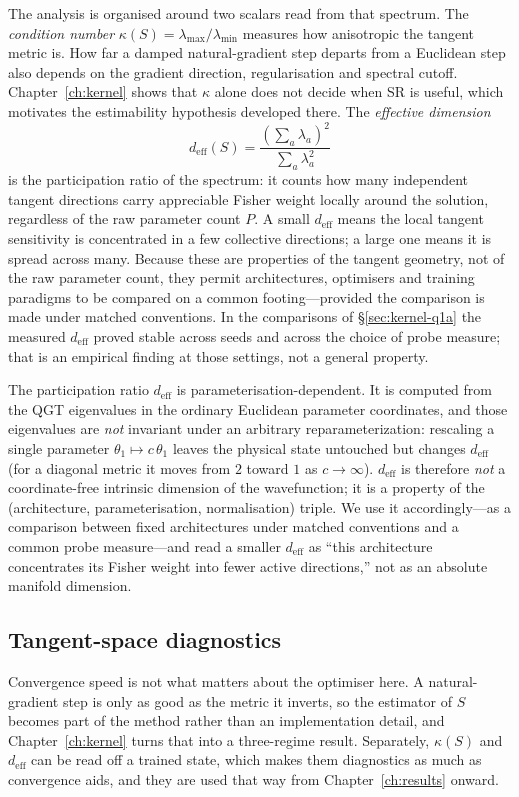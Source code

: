 The analysis is organised around two scalars read from that spectrum. The
\emph{condition number}
$\kappa(S)=\lambda_{\max}/\lambda_{\min}$ measures how anisotropic the tangent metric
is. How far a damped natural-gradient step departs from a Euclidean step also depends on the
gradient direction, regularisation and spectral cutoff. Chapter~\ref{ch:kernel} shows that
$\kappa$ alone does not decide when SR is useful, which motivates the estimability hypothesis
developed there. The \emph{effective dimension}
\begin{equation}
  d_{\mathrm{eff}}(S) = \frac{\left(\sum_a \lambda_a\right)^2}{\sum_a \lambda_a^2}
\end{equation}
is the participation ratio of the spectrum: it counts how many independent tangent
directions carry appreciable Fisher weight locally around the solution, regardless of the raw
parameter count $P$. A small $d_{\mathrm{eff}}$ means the local tangent sensitivity is
concentrated in a few collective directions; a large one means it is spread across many.
Because these are properties of the tangent geometry, not of the raw parameter count, they permit architectures, optimisers and training paradigms to be compared on a
common footing---provided the comparison is made under matched conventions. In the
comparisons of \S\ref{sec:kernel-q1a} the measured $d_{\mathrm{eff}}$ proved stable across
seeds and across the choice of probe measure; that is an empirical finding at those settings,
not a general property.

The participation ratio $d_{\mathrm{eff}}$ is parameterisation-dependent. It is computed
from the QGT eigenvalues in the ordinary Euclidean parameter coordinates, and those
eigenvalues are \emph{not} invariant under an arbitrary reparameterization: rescaling a
single parameter $\theta_1\mapsto c\,\theta_1$ leaves the physical state untouched but
changes $d_{\mathrm{eff}}$ (for a diagonal metric it moves from $2$ toward $1$ as
$c\to\infty$). $d_{\mathrm{eff}}$ is therefore \emph{not} a coordinate-free intrinsic
dimension of the wavefunction; it is a property of the (architecture, parameterisation,
normalisation) triple. We use it accordingly---as a comparison between fixed
architectures under matched conventions and a common probe measure---and read a smaller
$d_{\mathrm{eff}}$ as ``this architecture concentrates its Fisher weight into fewer active
directions,'' not as an absolute manifold dimension.

\subsection{Tangent-space diagnostics}
Convergence speed is not what matters about the optimiser here. A natural-gradient step is
only as good as the metric it inverts, so the estimator of $S$ becomes part of the method
rather than an implementation detail, and Chapter~\ref{ch:kernel} turns that into a
three-regime result. Separately, $\kappa(S)$ and $d_{\mathrm{eff}}$ can be read off a
trained state, which makes them diagnostics as much as convergence aids, and they are used
that way from Chapter~\ref{ch:results} onward.


